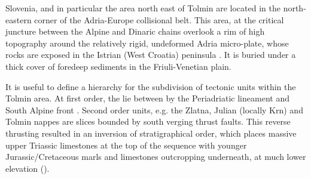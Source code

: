 Slovenia, and in particular the area north east of Tolmin are located in the north-eastern corner of the Adria-Europe collisional belt. 
This area, at the critical juncture between the Alpine and Dinaric chains overlook a rim of high topography around the relatively rigid, undeformed Adria micro-plate, whose rocks are  exposed in the Istrian (West Croatia) peninsula \citep{vsmuc2009tectonic}. 
It is buried under a thick cover of foredeep sediments in the Friuli-Venetian plain. 

It is useful to define a hierarchy for the subdivision of tectonic units within the Tolmin area. 
At first order, the  lie between by the Periadriatic lineament and South Alpine front \citep{placer1998contribution}. 
Second order units, e.g. the Zlatna, Julian (locally Krn) and Tolmin nappes are slices bounded by south verging thrust faults. 
This reverse thrusting resulted in an inversion of stratigraphical order, which places massive upper Triassic limestones at the top of the sequence with younger Jurassic/Cretaceous marls and limestones outcropping underneath, at much lower elevation ().

